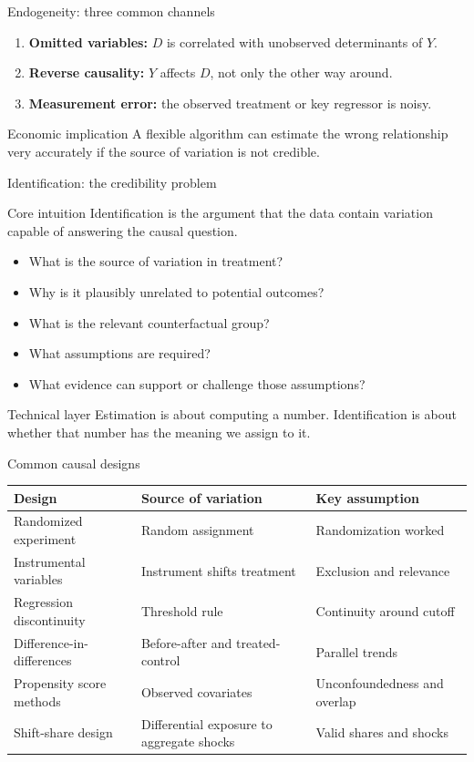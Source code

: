 \documentclass[aspectratio=169,11pt]{beamer}
\newcommand{\core}[1]{\begin{block}{Core intuition}#1\end{block}}
\newcommand{\grad}[1]{\begin{alertblock}{Technical layer}#1\end{alertblock}}
\begin{document}
\begin{frame}{Endogeneity: three common channels}
\begin{enumerate}
  \item \textbf{Omitted variables:} $D$ is correlated with unobserved determinants of $Y$.
  \item \textbf{Reverse causality:} $Y$ affects $D$, not only the other way around.
  \item \textbf{Measurement error:} the observed treatment or key regressor is noisy.
\end{enumerate}
\begin{alertblock}{Economic implication}
A flexible algorithm can estimate the wrong relationship very accurately if the source of variation is not credible.
\end{alertblock}
\end{frame}

\begin{frame}{Identification: the credibility problem}
\core{
Identification is the argument that the data contain variation capable of answering the causal question.
}
\begin{itemize}
  \item What is the source of variation in treatment?
  \item Why is it plausibly unrelated to potential outcomes?
  \item What is the relevant counterfactual group?
  \item What assumptions are required?
  \item What evidence can support or challenge those assumptions?
\end{itemize}
\grad{
Estimation is about computing a number. Identification is about whether that number has the meaning we assign to it.
}
\end{frame}

\begin{frame}{Common causal designs}
\begin{center}
\begin{tabular}{p{}p{}p{}}
\toprule
Design & Source of variation & Key assumption \\
\midrule
Randomized experiment & Random assignment & Randomization worked \\
Instrumental variables & Instrument shifts treatment & Exclusion and relevance \\
Regression discontinuity & Threshold rule & Continuity around cutoff \\
Difference-in-differences & Before-after and treated-control & Parallel trends \\
Propensity score methods & Observed covariates & Unconfoundedness and overlap \\
Shift-share design & Differential exposure to aggregate shocks & Valid shares and shocks \\
\bottomrule
\end{tabular}
\end{center}
\end{frame}
\end{document}
